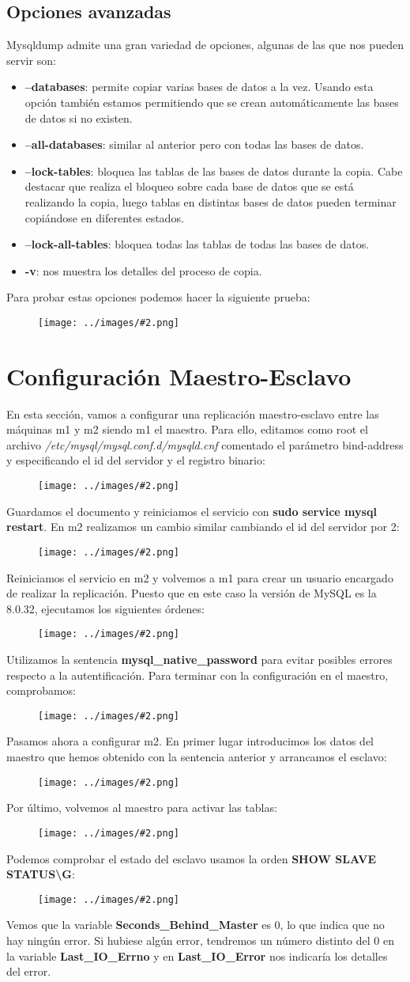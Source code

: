 \documentclass[twoside]{article}
\newcommand{\image}[2]{
\begin{figure}[H]
    \texttt{[image: ../images/\#2.png]}
    \centering
\end{figure}
}
\begin{document}
\subsection{Opciones avanzadas}
Mysqldump admite una gran variedad de opciones, algunas de las que nos pueden servir son:
\begin{itemize}
    \item \textbf{--databases}: permite copiar varias bases de datos a la vez. Usando esta opción también estamos permitiendo que se crean automáticamente las bases de datos si no existen.
    \item \textbf{--all-databases}: similar al anterior pero con todas las bases de datos.
    \item \textbf{--lock-tables}: bloquea las tablas de las bases de datos durante la copia. Cabe destacar que realiza el bloqueo sobre cada base de datos que se está realizando la copia, luego tablas en distintas bases de datos pueden terminar copiándose en diferentes estados.
    \item \textbf{--lock-all-tables}: bloquea todas las tablas de todas las bases de datos.
    \item \textbf{-v}: nos muestra los detalles del proceso de copia.
\end{itemize}
Para probar estas opciones podemos hacer la siguiente prueba:
\image{10}{13}

\section{Configuración Maestro-Esclavo}
En esta sección, vamos a configurar una replicación maestro-esclavo entre las máquinas m1 y m2 siendo m1 el maestro. Para ello, editamos como root el archivo \textit{/etc/mysql/mysql.conf.d/mysqld.cnf} comentado el parámetro bind-address y especificando el id del servidor y el registro binario:
\image{10}{14}
Guardamos el documento y reiniciamos el servicio con \textbf{sudo service mysql restart}. En m2 realizamos un cambio similar cambiando el id del servidor por 2:
\image{10}{15}
Reiniciamos el servicio en m2 y volvemos a m1 para crear un usuario encargado de realizar la replicación. Puesto que en este caso la versión de MySQL es la 8.0.32, ejecutamos los siguientes órdenes:
\image{10}{16}
Utilizamos la sentencia \textbf{mysql\_native\_password} para evitar posibles errores respecto a la autentificación. Para terminar con la configuración en el maestro, comprobamos:
\image{10}{17}
Pasamos ahora a configurar m2. En primer lugar introducimos los datos del maestro que hemos obtenido con la sentencia anterior y arrancamos el esclavo:
\image{10}{18}
Por último, volvemos al maestro para activar las tablas:
\image{10}{20}
Podemos comprobar el estado del esclavo usamos la orden \textbf{SHOW SLAVE STATUS\textbackslash G}:
\image{10}{21}
Vemos que la variable \textbf{Seconds\_Behind\_Master} es 0, lo que indica que no hay ningún error. Si hubiese algún error, tendremos un número distinto del 0 en la variable \textbf{Last\_IO\_Errno} y en \textbf{Last\_IO\_Error} nos indicaría los detalles del error. 
\end{document}
